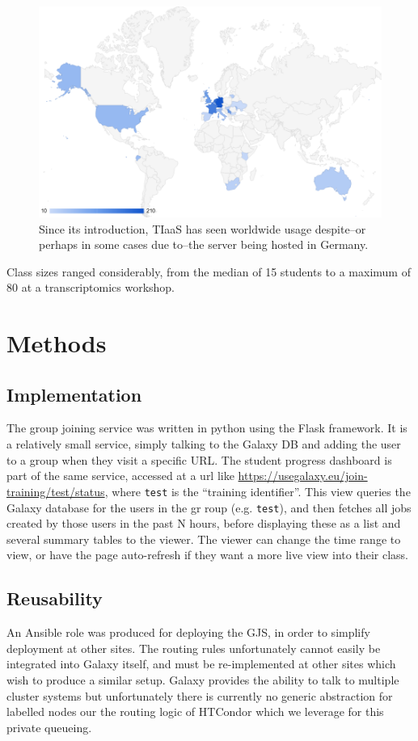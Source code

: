 \documentclass[a4paper,num-refs]{oup-contemporary}
\begin{document}
\begin{figure}[bt!]
\centering
\includegraphics[width=\linewidth]{images/map.png}
	\caption{Since its introduction, TIaaS has seen worldwide usage despite--or perhaps in some cases due to--the server being hosted in Germany.}\label{figure:map}
\end{figure}

Class sizes ranged considerably, from the median of 15 students to a maximum of 80 at a transcriptomics workshop. 


\section{Methods}

\subsection{Implementation}
The group joining service was written in python using the Flask framework. It is a relatively small service, simply talking to the Galaxy DB and adding the user to a group when they visit a specific URL.
The student progress dashboard is part of the same service, accessed at a url like \url{https://usegalaxy.eu/join-training/test/status}, where \texttt{test} is the ``training identifier''. This view queries the Galaxy database for the users in the gr roup (e.g. \texttt{test}), and then fetches all jobs created by those users in the past N hours, before displaying these as a list and several summary tables to the viewer. The viewer can change the time range to view, or have the page auto-refresh if they want a more live view into their class.

\subsection{Reusability}
An Ansible role was produced for deploying the GJS, in order to simplify deployment at other sites. The routing rules unfortunately cannot easily be integrated into Galaxy itself, and must be re-implemented at other sites which wish to produce a similar setup. Galaxy provides the ability to talk to multiple cluster systems but unfortunately there is currently no generic abstraction for labelled nodes our the routing logic of HTCondor which we leverage for this private queueing.
\end{document}
